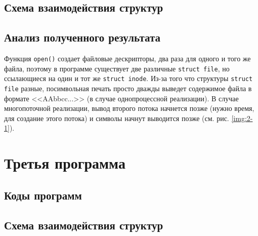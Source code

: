 \clearpage

\section{Схема взаимодействия структур}


\section{Анализ полученного результата}
Функция \texttt{open()} создает файловые дескрипторы, два раза для одного и того же файла, поэтому в программе существует две различные \texttt{struct file}, но ссылающиеся на один и тот же \texttt{struct inode}.
Из-за того что структуры \texttt{struct file} разные, посимвольная печать просто дважды выведет содержимое файла в формате <<AAbbcc...>> (в случае однопроцессной реализации).
В случае многопоточной реализации, вывод второго потока начнется позже (нужно время, для создание этого потока) и символы начнут выводится позже (см. рис. \ref{img:2-1}).

\clearpage

\chapter{Третья программа}

\section{Коды программ}



\clearpage



\clearpage
\section{Схема взаимодействия структур}


